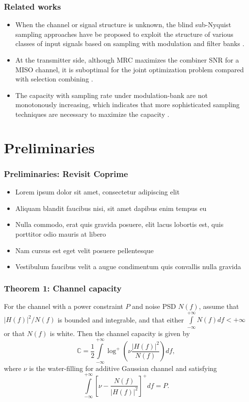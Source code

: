 \documentclass{beamer}
\begin{document}
\begin{frame}
\frametitle{Related works}
\begin{itemize}
  \item When the channel or signal structure is unknown, the blind sub-Nyquist sampling approaches have be proposed to exploit the structure of various classes of input signals based on sampling with modulation and filter banks \cite{Mishali:2010}.
  \item At the transmitter side, although MRC maximizes the combiner SNR for a MISO channel, it is suboptimal for the joint optimization problem compared with selection combining \cite{Goldsmith:2005}.
  \item The capacity with sampling rate under modulation-bank are not monotonously increasing, which indicates that more sophisticated sampling techniques are necessary to maximize the capacity \cite{Chen:20132}.

\end{itemize}
\end{frame}


\section{Preliminaries}

\begin{frame}
\frametitle{Preliminaries: Revisit Coprime}
\begin{itemize}
\item Lorem ipsum dolor sit amet, consectetur adipiscing elit
\item Aliquam blandit faucibus nisi, sit amet dapibus enim tempus eu
\item Nulla commodo, erat quis gravida posuere, elit lacus lobortis est, quis porttitor odio mauris at libero
\item Nam cursus est eget velit posuere pellentesque
\item Vestibulum faucibus velit a augue condimentum quis convallis nulla gravida
\end{itemize}
\end{frame}

\begin{frame}
\frametitle{Theorem 1: Channel capacity}
\begin{block}{}
  \cite[Th. 8.5.1]{Gallager:1968} For the channel with a power constraint $P$ and noise PSD $N(f)$, assume that $|H(f)|^2/N(f)$ is bounded and integrable, and that either $\int\limits_{-\infty}^{+\infty}N(f)df<+\infty$ or that $N(f)$ is white. Then the channel capacity is given by
  \begin{equation}
    \label{nyquist_rate}
    \mathbb{C}=\frac{1}{2}\int\limits_{-\infty}^{+\infty}\log^+\left( \nu\frac{|H(f)|^2}{N(f)}\right)df,
  \end{equation}
where $\nu$ is the water-filling for additive Gaussian channel and satisfying
\begin{equation}
  \int\limits_{-\infty}^{+\infty}\left[\nu-\frac{N(f)}{|H(f)|^2}\right]^+df=P.
\end{equation}
\end{block}
\end{frame}
\end{document}
